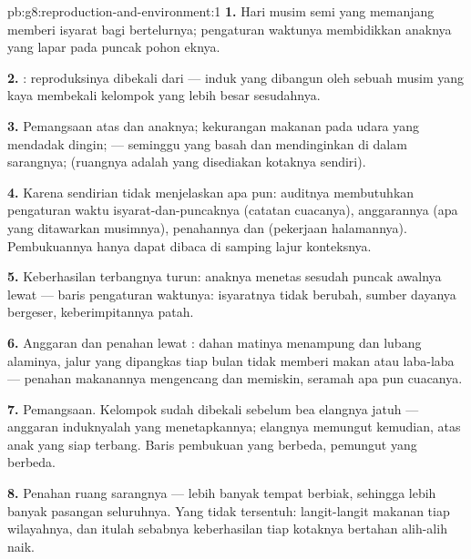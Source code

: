 \begin{solution}{pb:g8:reproduction-and-environment:1}
\textbf{1.} Hari musim semi yang memanjang memberi isyarat bagi
bertelurnya; pengaturan waktunya membidikkan anaknya yang lapar pada
puncak  pohon eknya.

\textbf{2.} :
reproduksinya dibekali dari  --- induk yang dibangun oleh
sebuah musim yang kaya membekali kelompok  yang lebih besar
sesudahnya.

\textbf{3.} Pemangsaan atas  dan anaknya; kekurangan makanan pada
udara yang mendadak dingin;  --- seminggu yang basah dan
mendinginkan di dalam sarangnya; (ruangnya adalah yang disediakan
kotaknya sendiri).

\textbf{4.} Karena  sendirian tidak menjelaskan apa pun:
auditnya membutuhkan pengaturan waktu isyarat-dan-puncaknya (catatan
cuacanya), anggarannya (apa yang ditawarkan musimnya), penahannya dan
 (pekerjaan halamannya). Pembukuannya hanya dapat dibaca di
samping lajur konteksnya.

\textbf{5.} Keberhasilan terbangnya turun: anaknya menetas sesudah
puncak awalnya lewat --- baris pengaturan waktunya: isyaratnya tidak
berubah, sumber dayanya bergeser, keberimpitannya patah.

\textbf{6.} Anggaran dan penahan lewat : dahan matinya
menampung  dan lubang alaminya, jalur yang dipangkas tiap
bulan tidak memberi makan  atau laba-laba --- penahan makanannya
mengencang dan  memiskin, seramah apa pun cuacanya.

\textbf{7.} Pemangsaan. Kelompok  sudah dibekali sebelum bea
elangnya jatuh --- anggaran induknyalah yang menetapkannya; elangnya
memungut kemudian, atas anak yang siap terbang. Baris pembukuan yang
berbeda, pemungut yang berbeda.

\textbf{8.} Penahan ruang sarangnya --- lebih banyak tempat berbiak,
sehingga lebih banyak pasangan seluruhnya. Yang tidak tersentuh:
langit-langit makanan tiap wilayahnya, dan itulah sebabnya keberhasilan
tiap kotaknya bertahan alih-alih naik.


\end{solution}
